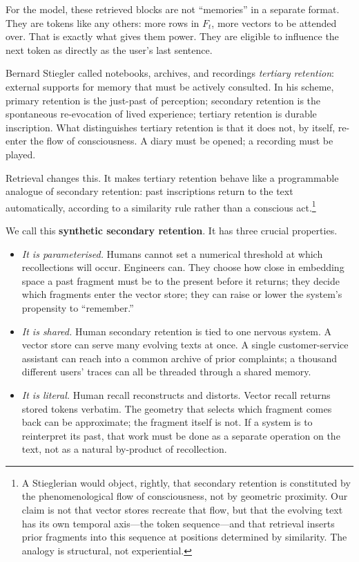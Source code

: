\documentclass[12pt,a4paper]{article}
\begin{document}
For the model, these retrieved blocks are not ``memories'' in a separate format. They are tokens like any others: more rows in $F_t$, more vectors to be attended over. That is exactly what gives them power. They are eligible to influence the next token as directly as the user's last sentence.

Bernard Stiegler called notebooks, archives, and recordings \emph{tertiary retention}: external supports for memory that must be actively consulted.\cite{stiegler2009technics} In his scheme, primary retention is the just-past of perception; secondary retention is the spontaneous re-evocation of lived experience; tertiary retention is durable inscription. What distinguishes tertiary retention is that it does not, by itself, re-enter the flow of consciousness. A diary must be opened; a recording must be played.

Retrieval changes this. It makes tertiary retention behave like a programmable analogue of secondary retention: past inscriptions return to the text automatically, according to a similarity rule rather than a conscious act.\footnote{A Stieglerian would object, rightly, that secondary retention is constituted by the phenomenological flow of consciousness, not by geometric proximity. Our claim is not that vector stores recreate that flow, but that the evolving text has its own temporal axis---the token sequence---and that retrieval inserts prior fragments into this sequence at positions determined by similarity. The analogy is structural, not experiential.}

We call this \textbf{synthetic secondary retention}. It has three crucial properties.

\begin{itemize}
  \item \emph{It is parameterised.} Humans cannot set a numerical threshold at which recollections will occur. Engineers can. They choose how close in embedding space a past fragment must be to the present before it returns; they decide which fragments enter the vector store; they can raise or lower the system's propensity to ``remember.''

  \item \emph{It is shared.} Human secondary retention is tied to one nervous system. A vector store can serve many evolving texts at once. A single customer-service assistant can reach into a common archive of prior complaints; a thousand different users' traces can all be threaded through a shared memory.

  \item \emph{It is literal.} Human recall reconstructs and distorts. Vector recall returns stored tokens verbatim. The geometry that selects which fragment comes back can be approximate; the fragment itself is not. If a system is to reinterpret its past, that work must be done as a separate operation on the text, not as a natural by-product of recollection.
\end{itemize}
\end{document}
